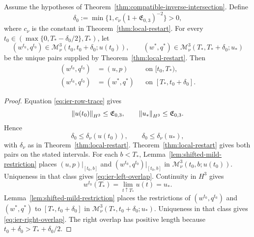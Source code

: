 \begin{lemma}
\label{lem:ier-late-slice-overlap}
Assume the hypotheses of
Theorem~\ref{thm:compatible-inverse-intersection}.
Define
\begin{equation}
 \delta_0
 :=\min\{1,c_\nu(1+\mathfrak E_{0,3})^{-2}\}>0,
 \label{eq:ier-uniform-restart-time}
\end{equation}
where \(c_\nu\) is the constant in Theorem~\ref{thm:local-restart}.
For every
\(t_0\in(\max\{0,T_*-\delta_0/2\},T_*)\), let
\[
 (w^{t_0},q^{t_0})
 \in\mathscr M_\nu^3(t_0,t_0+\delta_0;u(t_0)),
 \qquad
 (w^*,q^*)
 \in\mathscr M_\nu^3(T_*,T_*+\delta_0;u_*)
\]
be the unique pairs supplied by Theorem~\ref{thm:local-restart}.  Then
\begin{align}
 (w^{t_0},q^{t_0})&=(u,p)
 &&\text{on }[t_0,T_*),
 \label{eq:ier-left-overlap}\\
 (w^{t_0},q^{t_0})&=(w^*,q^*)
 &&\text{on }[T_*,t_0+\delta_0].
 \label{eq:ier-right-overlap}
\end{align}
\end{lemma}

\begin{proof}
Equation \eqref{eq:ier-row-trace} gives
\[
 \left\lVert u(t_0)\right\rVert_{H^3}\le\mathfrak E_{0,3},
 \qquad
 \left\lVert u_*\right\rVert_{H^3}\le\mathfrak E_{0,3}.
\]
Hence
\[
 \delta_0\le\delta_\nu(u(t_0)),
 \qquad
 \delta_0\le\delta_\nu(u_*),
\]
with \(\delta_\nu\) as in Theorem~\ref{thm:local-restart}.
Theorem~\ref{thm:local-restart} gives both pairs on the stated intervals.
For each \(b<T_*\), Lemma~\ref{lem:shifted-mild-restriction} places
\((u,p)|_{[t_0,b]}\) and
\((w^{t_0},q^{t_0})|_{[t_0,b]}\) in
\(\mathscr M_\nu^3(t_0,b;u(t_0))\).  Uniqueness in that class gives
\eqref{eq:ier-left-overlap}.  Continuity in \(H^3\) gives
\[
 w^{t_0}(T_*)=\lim_{t\uparrow T_*}u(t)=u_*.
\]
Lemma~\ref{lem:shifted-mild-restriction} places the restrictions of
\((w^{t_0},q^{t_0})\) and \((w^*,q^*)\) to
\([T_*,t_0+\delta_0]\) in
\(\mathscr M_\nu^3(T_*,t_0+\delta_0;u_*)\).  Uniqueness in that class gives
\eqref{eq:ier-right-overlap}.  The right overlap has positive length because
\(t_0+\delta_0>T_*+\delta_0/2\).
\end{proof}

